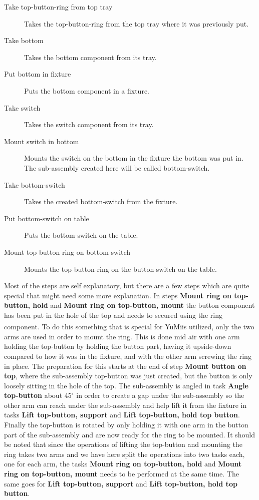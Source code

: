 \begin{description}
\item[Take top-button-ring from top tray] Takes the top-button-ring from the top tray where it was previously put.

\item[Take bottom] Takes the bottom component from its tray.

\item[Put bottom in fixture] Puts the bottom component in a fixture.

\item[Take switch] Takes the switch component from its tray.

\item[Mount switch in bottom] Mounts the switch on the bottom in the fixture the bottom was put in. The sub-assembly created here will be called bottom-switch.

\item[Take bottom-switch] Takes the created bottom-switch from the fixture.

\item[Put bottom-switch on table] Puts the bottom-switch on the table.

\item[Mount top-button-ring on bottom-switch] Mounts the top-button-ring on the button-switch on the table.
\end{description}

\noindent Most of the steps are self explanatory, but there are a few steps which are quite special that might need some more explanation. In steps \textbf{Mount ring on top-button, hold} and \textbf{Mount ring on top-button, mount} the button component has been put in the hole of the top and needs to secured using the ring component. To do this something that is special for YuMi\textsuperscript\textregistered is utilized, only the two arms are used in order to mount the ring. This is done mid air with one arm holding the top-button by holding the button part, having it upside-down compared to how it was in the fixture, and with the other arm screwing the ring in place. The preparation for this starts at the end of step \textbf{Mount button on top}, where the sub-assembly top-button was just created, but the button is only loosely sitting in the hole of the top. The sub-assembly is angled in task \textbf{Angle top-button} about 45$^\circ$ in order to create a gap under the sub-assembly so the other arm can reach under the sub-assembly and help lift it from the fixture in tasks \textbf{Lift top-button, support} and \textbf{Lift top-button, hold top button}. Finally the top-button is rotated by only holding it with one arm in the button part of the sub-assembly and are now ready for the ring to be mounted.
It should be noted that since the operations of lifting the top-button and mounting the ring takes two arms and we have here split the operations into two tasks each, one for each arm, the tasks \textbf{Mount ring on top-button, hold} and \textbf{Mount ring on top-button, mount} needs to be performed at the same time. The same goes for  \textbf{Lift top-button, support} and \textbf{Lift top-button, hold top button}.

